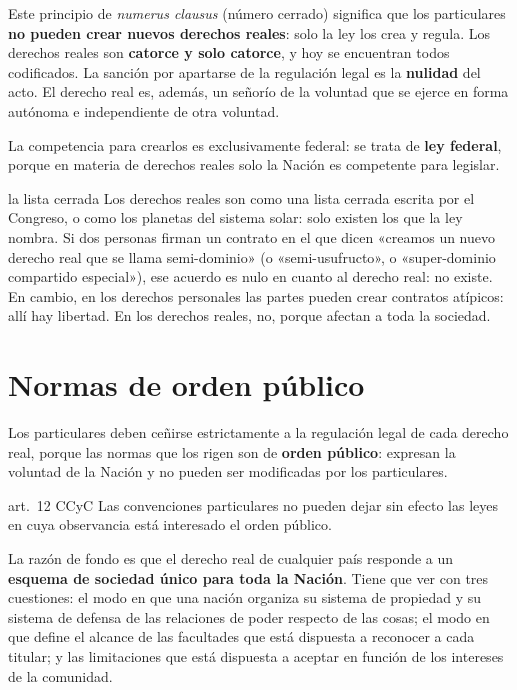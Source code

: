 \documentclass[12pt,oneside]{book}
\begin{document}
Este principio de \textit{numerus clausus} (número cerrado) significa que los particulares \textbf{no pueden crear nuevos derechos reales}: solo la ley los crea y regula. Los derechos reales son \textbf{catorce y solo catorce}, y hoy se encuentran todos codificados. La sanción por apartarse de la regulación legal es la \textbf{nulidad} del acto. El derecho real es, además, un señorío de la voluntad que se ejerce en forma autónoma e independiente de otra voluntad.

La competencia para crearlos es exclusivamente federal: se trata de \textbf{ley federal}, porque en materia de derechos reales solo la Nación es competente para legislar.

\begin{ejemplo}{la lista cerrada}
Los derechos reales son como una lista cerrada escrita por el Congreso, o como los planetas del sistema solar: solo existen los que la ley nombra. Si dos personas firman un contrato en el que dicen «creamos un nuevo derecho real que se llama semi-dominio» (o «semi-usufructo», o «super-dominio compartido especial»), ese acuerdo es nulo en cuanto al derecho real: no existe. En cambio, en los derechos personales las partes pueden crear contratos atípicos: allí hay libertad. En los derechos reales, no, porque afectan a toda la sociedad.
\end{ejemplo}

\section{Normas de orden público}

Los particulares deben ceñirse estrictamente a la regulación legal de cada derecho real, porque las normas que los rigen son de \textbf{orden público}: expresan la voluntad de la Nación y no pueden ser modificadas por los particulares.

\begin{regla}{art.~12 CCyC}
Las convenciones particulares no pueden dejar sin efecto las leyes en cuya observancia está interesado el orden público.
\end{regla}

La razón de fondo es que el derecho real de cualquier país responde a un \textbf{esquema de sociedad único para toda la Nación}. Tiene que ver con tres cuestiones: el modo en que una nación organiza su sistema de propiedad y su sistema de defensa de las relaciones de poder respecto de las cosas; el modo en que define el alcance de las facultades que está dispuesta a reconocer a cada titular; y las limitaciones que está dispuesta a aceptar en función de los intereses de la comunidad.
\end{document}
